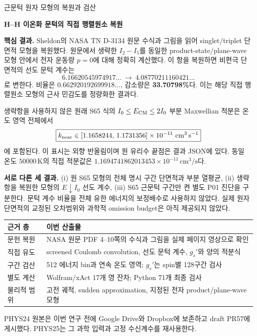 \documentclass[11pt,a4paper]{article}
\numberwithin{equation}{section}
\begin{document}
{\large\sffamily 근문턱 원자 모형의 복원과 검산}\par
{\LARGE\bfseries H--H 이온화 문턱의 직접 행렬원소 복원}\par
\vspace{2mm}
\textbf{핵심 결과.} Sheldon의 NASA TN D-3134 원문 수식과 그림을 읽어 singlet/triplet 단면적 모형을 복원했다. 원문에서 생략한 $I_2-I_5$를 동일한 product-state/plane-wave 모형 안에서 전자 운동량 $p=0$에 대해 정확히 계산했다. 이 항을 복원하면 비편극 단면적의 선도 문턱 계수는
\[
6.16620545974917\ldots\ \longrightarrow\ 4.08770211160421\ldots
\]
로 변한다. 비율은 $0.662920192699918\ldots$, 감소량은 \textbf{33.70798\%}다. 이는 해당 직접 행렬원소 모형의 근사 민감도를 정량화한 결과다.

생략항을 사용하지 않은 원래 S65 식의 $I_0\le E_{\mathrm{CM}}\le2I_0$ 부분 Maxwellian 적분은 온도 영역 전체에서
\[
\boxed{k_{\rm near}\in[1.1658244,\,1.1731356]\times10^{-11}\ \mathrm{cm^3\,s^{-1}}}
\]
에 포함된다. 이 표시는 외향 반올림이며 원 유리수 끝점은 결과 JSON에 있다. 동일 온도 $50000\,\mathrm K$의 직접 적분값은 $1.1694741862013453\times10^{-11}\,\mathrm{cm^3/s}$다.

\textbf{서로 다른 세 결과.} (i) 원 S65 모형의 전체 명시 구간 단면적과 부분 열평균, (ii) 생략항을 복원한 모형의 $E\downarrow I_0$ 선도 계수, (iii) S65 근문턱 구간만 켠 별도 P01 진단을 구분한다. 문턱 계수 비율을 전체 유한 에너지의 보정배수로 사용하지 않았다. 실제 원자 단면적의 교정된 오차범위와 과학적 omission budget은 아직 제공되지 않았다.

\begin{center}\begin{tabularx}{\linewidth}{@{}p{31mm}X@{}}\toprule
근거 층 & 이번 산출물\\\midrule
문헌 복원 & NASA 원문 PDF 4--10쪽의 수식과 그림을 실제 페이지 영상으로 확인\\
직접 유도 & screened Coulomb convolution, 선도 문턱 계수, $g_s'$와 양의 적분식\\
구간 검산 & 512 에너지 bin과 연속 온도 영역; $g_s'$는 spin별 128구간 검사\\
별도 계산 & Wolfram/xAct 17개 영 잔차; Python 71개 최종 검사\\
물리적 범위 & 고전 궤적, sudden approximation, 지정된 전자 product/plane-wave 모형\\\bottomrule
\end{tabularx}\end{center}
PHYS24 원본은 이번 연구 전에 Google Drive와 Dropbox에 보존하고 draft PR57에 게시했다. PHYS25는 그 과학 입력과 고정 수신계수를 재사용한다.
\end{document}
